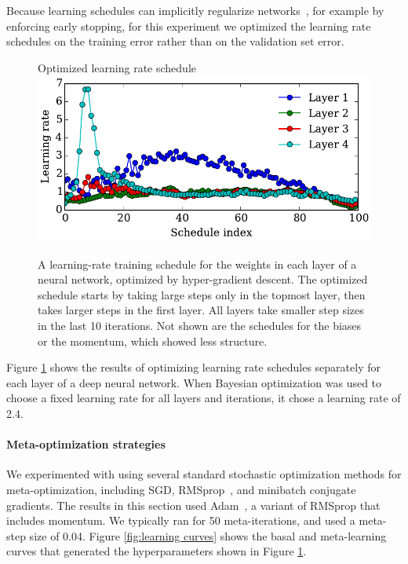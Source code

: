 \documentclass{article}
\newcommand{\primal}{basal}
\begin{document}
Because learning schedules can implicitly regularize networks~\cite{erhan2010does}, for example by enforcing early stopping, for this experiment we optimized the learning rate schedules on the training error rather than on the validation set error.
%
\begin{figure}[h!]
\vskip 0.1in
\begin{center}
Optimized learning rate schedule \\
\includegraphics[width=\columnwidth]{../experiments/Feb_3_training_schedules/3_adam_50/schedules_small.pdf}
\vskip -0.1in
\caption{A learning-rate training schedule for the weights in each layer of a neural network, optimized by hyper-gradient descent.
The optimized schedule starts by taking large steps only in the topmost layer, then takes larger steps in the first layer.
All layers take smaller step sizes in the last 10 iterations.
Not shown are the schedules for the biases or the momentum, which showed less structure.}
\label{fig:optimal schedule}
\end{center}
\vskip -0.1in
\end{figure} 
%
Figure \ref{fig:optimal schedule} shows the results of optimizing learning rate schedules separately for each layer of a deep neural network.
When Bayesian optimization was used to choose a fixed learning rate for all layers and iterations, it chose a learning rate of 2.4.

\paragraph{Meta-optimization strategies}
We experimented with using several standard stochastic optimization methods for meta-optimization, including SGD, RMSprop~\citep{Tieleman2012}, and minibatch conjugate gradients.
The results in this section used Adam~\citep{Adam14}, a variant of RMSprop that includes momentum.
We typically ran for 50 meta-iterations, and used a meta-step size of 0.04.
Figure \ref{fig:learning curves} shows the \primal{} and meta-learning curves that generated the hyperparameters shown in Figure \ref{fig:optimal schedule}.
\end{document}
